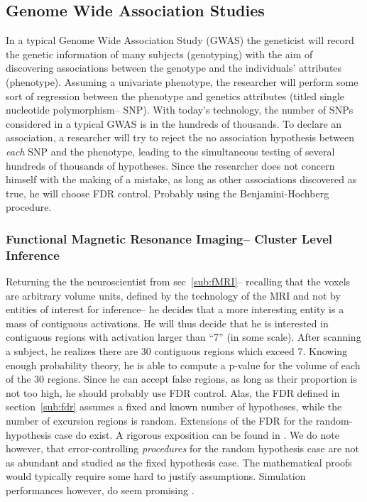 \documentclass[draft,12pt]{article}
\begin{document}
\subsection{Genome Wide Association Studies}
In a typical Genome Wide Association Study (GWAS) the geneticist will record the genetic information of many subjects (genotyping) with the aim of discovering associations between the genotype and the individuals' attributes (phenotype). Assuming a univariate phenotype, the researcher will perform some sort of regression between the phenotype and genetics attributes (titled single nucleotide polymorphism-- SNP). With today's technology, the number of SNPs considered in a typical GWAS is in the hundreds of thousands. To declare an association, a researcher will try to reject the no association hypothesis between \emph{each} SNP and the phenotype, leading to the simultaneous testing of several hundreds of thousands of hypotheses. Since the researcher does not concern himself with the making of a mistake, as long as other associations discovered as true, he will choose FDR control. Probably using the Benjamini-Hochberg procedure.



\subsubsection{Functional Magnetic Resonance Imaging-- Cluster Level Inference}
Returning the the neuroscientist from sec~\ref{sub:fMRI}-- recalling that the voxels are arbitrary volume units, defined by the technology of the MRI and not by entities of interest for inference-- he decides that a more interesting entity is a mass of contiguous activations. He will thus decide that he is interested in contiguous regions with activation larger than ``7'' (in some scale). After scanning a subject, he realizes there are 30 contiguous regions which exceed 7. Knowing enough probability theory, he is able to compute a p-value for the volume of each of the 30 regions. Since he can accept false regions, as long as their proportion is not too high, he should probably use FDR control. Alas, the FDR defined in section~\ref{sub:fdr} assumes a fixed and known number of hypotheses, while the number of excursion regions is random. Extensions of the FDR for the random-hypothesis case do exist. A rigorous exposition can be found in  \citet{siegmund_false_2011}. We do note however, that error-controlling \emph{procedures} for the random hypothesis case are not as abundant and studied as the fixed hypothesis case. The mathematical proofs would typically require some hard to justify assumptions. Simulation performances however, do seem promising \citep{chumbley_false_2009,chumbley_topological_2010}.
\end{document}
